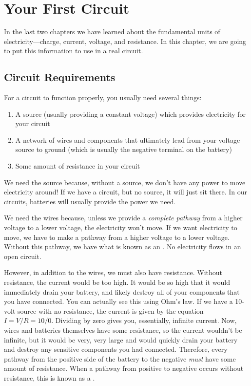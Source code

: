 \chapter{Your First Circuit}
\label{chapFirstCircuit}

In the last two chapters we have learned about the fundamental units of electricity---charge, current, voltage, and resistance.
In this chapter, we are going to put this information to use in a real circuit.

\section{Circuit Requirements}

For a circuit to function properly, you usually need several things:

\begin{enumerate}
\item A source (usually providing a constant voltage) which provides electricity for your circuit
\item A network of wires and components that ultimately lead from your voltage source to ground (which is usually the negative terminal on the battery)
\item Some amount of resistance in your circuit
\end{enumerate}

We need the source because, without a source, we don't have any power to move electricity around!
If we have a circuit, but no source, it will just sit there.
In our circuits, batteries will usually provide the power we need.

We need the wires because, unless we provide a \emph{complete pathway} from a higher voltage to a lower voltage, the electricity won't move.  
If we want electricity to move, we have to make a pathway from a higher voltage to a lower voltage.
Without this pathway, we have what is known as an .
No electricity flows in an open circuit.

However, in addition to the wires, we must also have resistance.
Without resistance, the current would be too high.
It would be so high that it would immediately drain your battery, and likely destroy all of your components that you have connected.
You can actually see this using Ohm's law.
If we have a 10-volt source with no resistance, the current is given by the equation $I = V / R = 10 / 0$.
Dividing by zero gives you, essentially, infinite current.
Now, wires and batteries themselves have some resistance, so the current wouldn't be infinite, but it would be very, very large and would quickly drain your battery and destroy any sensitive components you had connected.
Therefore, every pathway from the positive side of the battery to the negative \emph{must} have some amount of resistance.
When a pathway from positive to negative occurs without resistance, this is known as a .

